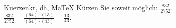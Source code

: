 \begin{MAufgabe}{Kuerzen}{kr, dh, MaTeX}
K\"urzen Sie soweit m\"oglich: $\frac{832}{2752}$.\\ 
\ifLsg\MLoesung
\quad $\frac{832}{2752}=\frac{(64)\cdot(13)}{(64)\cdot(43)}=\frac{13}{43}$.\else\relax\fi
 \end{MAufgabe}